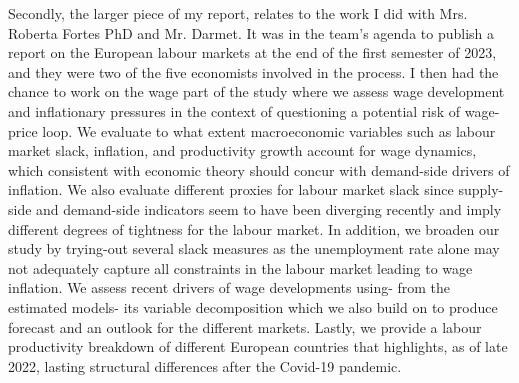 Secondly, the larger piece of my report, relates to the work I did with Mrs. Roberta Fortes PhD and Mr. Darmet. 
It was in the team's agenda to publish a report on the European labour markets\cite{az_labour} at the end of the first semester of 2023, and they were two of the five economists involved in the process. 
I then had the chance to work on the wage part of the study where we assess wage development and inflationary pressures in the context of questioning a potential risk of wage-price loop. 
We evaluate to what extent macroeconomic variables such as labour market slack, inflation, and productivity growth account for wage dynamics, which consistent with economic theory should concur with demand-side drivers of inflation. 
We also evaluate different proxies for labour market slack since supply-side and demand-side indicators seem to have been diverging recently and imply different degrees of tightness for the labour market. 
In addition, we broaden our study by trying-out several slack measures as the unemployment rate alone may not adequately capture all constraints in the labour market leading to wage inflation. 
We assess recent drivers of wage developments using- from the estimated models- its variable decomposition which we also build on to produce forecast and an outlook for the different markets. 
Lastly, we provide a labour productivity breakdown of different European countries that highlights, as of late 2022, lasting structural differences after the Covid-19 pandemic.
